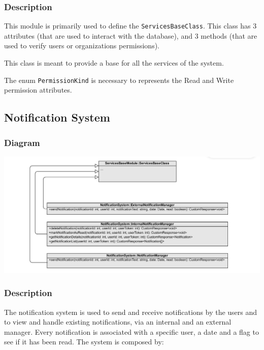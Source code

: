 \documentclass{article}
\begin{document}
\subsubsection{Description}

This module is primarily used to define the  \texttt{ServicesBaseClass}.
This class has 3 attributes (that are used to interact with the database), and
3 methods (that are used to verify users or organizations permissions).

This class is meant to provide a base for all the services of the system.

The enum \texttt{PermissionKind} is necessary to represents the Read and Write permission attributes.


\subsection{Notification System}
\subsubsection{Diagram}

\includegraphics[width=\textwidth,height=\textheight,keepaspectratio]{images/class_diagram/notificationSystem.jpg}

\subsubsection{Description}

The notification system is used to send and receive notifications by the users and to view and handle existing notifications, via an internal and an external manager. Every notification is associated with a specific user, a date and a flag to see if it has been read. The system is composed by:
\end{document}
